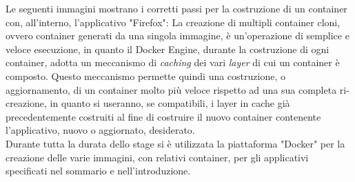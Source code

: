 Le seguenti immagini mostrano i corretti passi per la costruzione di un container con, all'interno, l'applicativo "Firefox":
La creazione di multipli container cloni, ovvero container generati da una singola immagine, è un'operazione di semplice e veloce esecuzione, in quanto il Docker Engine, durante la costruzione di ogni container, adotta un meccanismo di \textit{\gls{caching}} dei vari \textit{\gls{layer}} di cui un container è composto. Questo meccanismo permette quindi una costruzione, o aggiornamento, di un container molto più veloce rispetto ad una sua completa ri-creazione, in quanto si useranno, se compatibili, i layer in cache già precedentemente costruiti al fine di costruire il nuovo container contenente l'applicativo, nuovo o aggiornato, desiderato.\\
Durante tutta la durata dello stage si è utilizzata la piattaforma "Docker" per la creazione delle varie immagini, con relativi container, per gli applicativi specificati nel sommario e nell'introduzione.




